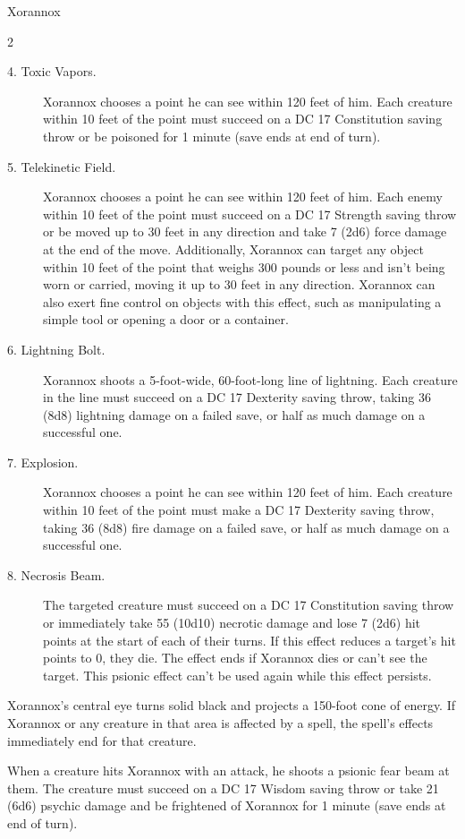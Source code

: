 \documentclass[10pt,a4paper,twoside,bg=print,twocolumn,openany,nodeprecatedcode]{dndbook}
\begin{document}
\begin{DndMonster}[float*=b,width=\textwidth + 8pt]{Xorannox}
\begin{multicols}{2}
\begin{description}
\item[4. Toxic Vapors.]
Xorannox chooses a point he can see within 120 feet of him. Each creature within 10 feet of the point must succeed on a DC 17 Constitution saving throw or be poisoned for 1 minute (save ends at end of turn).

\item[5. Telekinetic Field.]
Xorannox chooses a point he can see within 120 feet of him. Each enemy within 10 feet of the point must succeed on a DC 17 Strength saving throw or be moved up to 30 feet in any direction and take 7 (2d6) force damage at the end of the move. Additionally, Xorannox can target any object within 10 feet of the point that weighs 300 pounds or less and isn't being worn or carried, moving it up to 30 feet in any direction. Xorannox can also exert fine control on objects with this effect, such as manipulating a simple tool or opening a door or a container.

\item[6. Lightning Bolt.]
Xorannox shoots a 5-foot-wide, 60-foot-long line of lightning. Each creature in the line must succeed on a DC 17 Dexterity saving throw, taking 36 (8d8) lightning damage on a failed save, or half as much damage on a successful one.

\item[7. Explosion.]
Xorannox chooses a point he can see within 120 feet of him. Each creature within 10 feet of the point must make a DC 17 Dexterity saving throw, taking 36 (8d8) fire damage on a failed save, or half as much damage on a successful one.

\item[8. Necrosis Beam.]
The targeted creature must succeed on a DC 17 Constitution saving throw or immediately take 55 (10d10) necrotic damage and lose 7 (2d6) hit points at the start of each of their turns. If this effect reduces a target's hit points to 0, they die. The effect ends if Xorannox dies or can't see the target. This psionic effect can't be used again while this effect persists.

\end{description}

Xorannox's central eye turns solid black and projects a 150-foot cone of energy. If Xorannox or any creature in that area is affected by a spell, the spell's effects immediately end for that creature.

When a creature hits Xorannox with an attack, he shoots a psionic fear beam at them. The creature must succeed on a DC 17 Wisdom saving throw or take 21 (6d6) psychic damage and be frightened of Xorannox for 1 minute (save ends at end of turn).


\end{multicols}
\end{DndMonster}
\end{document}
